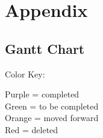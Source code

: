 \documentclass[11pt]{article}
\begin{document}






\newpage

\section{Appendix}



\subsection{Gantt Chart}

\hypertarget{app_gantt}{}
Color Key:

Purple = completed \\
Green  = to be completed\\
Orange = moved forward\\
Red = deleted\\
\end{document}
